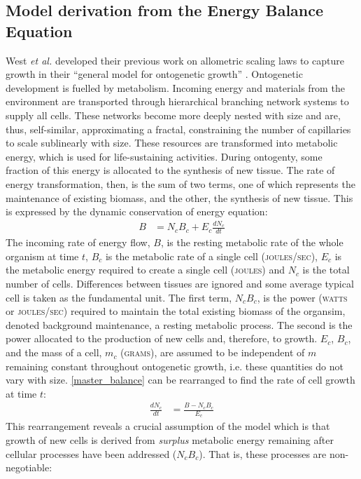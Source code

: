 \documentclass[a4paper]{article} %
\begin{document}
\subsection{Model derivation from the Energy Balance Equation}
West \textit{et al.} developed their previous work on allometric scaling laws \autocite{West1997} to capture growth in their ``general model for ontogenetic growth'' \autocite{West2001}. Ontogenetic development is fuelled by metabolism. Incoming energy and materials from the environment are transported through hierarchical branching network systems to supply all cells. These networks become more deeply nested with size and are, thus, self-similar, approximating a fractal, constraining the number of capillaries to scale sublinearly with size. These resources are transformed into metabolic energy, which is used for life-sustaining activities. During ontogenty, some fraction of this energy is allocated to the synthesis of new tissue. The rate of energy transformation, then, is the sum of two terms, one of which represents the maintenance of existing biomass, and the other, the synthesis of new tissue. This is expressed by the dynamic conservation of energy equation:
\begin{align}
    B &= N_{c}B_{c} + E_{c}\frac{dN_{c}}{dt} \label{master_balance}
\end{align}
The incoming rate of energy flow, $B$, is the resting metabolic rate of the whole organism at time $t$, $B_c$ is the metabolic rate of a single cell (\textsc{joules/sec}), $E_c$ is the metabolic energy required to create a single cell (\textsc{joules}) and $N_c$ is the total number of cells. Differences between tissues are ignored and some average typical cell is taken as the fundamental unit. The first term, $N_{c}B_{c}$, is the power (\textsc{watts} or \textsc{joules/sec}) required to maintain the total existing biomass of the organsim, denoted background maintenance, a resting metabolic process. The second is the power allocated to the production of new cells and, therefore, to growth. $E_c$, $B_c$, and the mass of a cell, $m_c$ (\textsc{grams}), are assumed to be independent of $m$ remaining constant throughout ontogenetic growth, i.e. these quantities do not vary with size. \cref{master_balance} can be rearranged to find the rate of cell growth at time $t$: 
\begin{align}
    \frac{dN_{c}}{dt} &= \frac{B - N_{c}B_{c}}{E_{c}} \label{cell_rate}
\end{align}
This rearrangement reveals a crucial assumption of the model which is that growth of new cells is derived from \textit{surplus} metabolic energy remaining after cellular processes have been addressed ($N_{c}B_{c}$). That is, these processes are non-negotiable:
\end{document}
